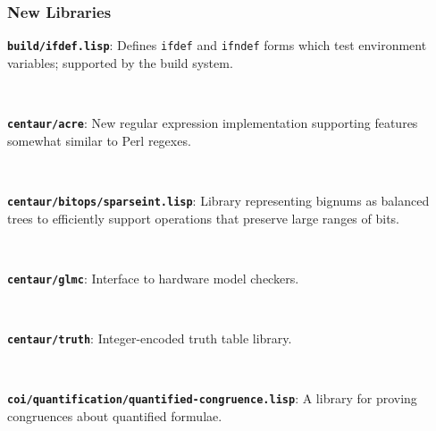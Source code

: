 \documentclass{beamer}
\newcommand{\code}[1]{\texttt{#1}}
\newcommand{\bookpath}[1]{\textbf{\code{#1}}}
\newcommand{\newlibtitle}{\frametitle{New Libraries}}
\begin{document}













\begin{frame}

\newlibtitle

\bookpath{build/ifdef.lisp}:
Defines \code{ifdef} and \code{ifndef} forms which test environment variables;
supported by the build system.

\

\bookpath{centaur/acre}:
New regular expression implementation supporting features somewhat similar to Perl regexes.

\

\bookpath{centaur/bitops/sparseint.lisp}:
Library representing bignums as balanced trees to efficiently support
operations that preserve large ranges of bits.

\

\bookpath{centaur/glmc}:
Interface to hardware model checkers.

\

\bookpath{centaur/truth}:
Integer-encoded truth table library.

\

\bookpath{coi/quantification/quantified-congruence.lisp}:
A library for proving congruences about quantified formulae.

\end{frame}
\end{document}
